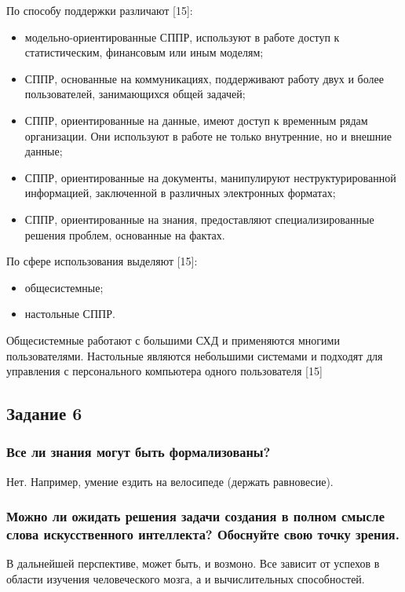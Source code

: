 \documentclass[14pt,a4paper,report]{report}
\begin{document}
По способу поддержки различают [15]:

\begin{itemize}
	\item модельно-ориентированные СППР, используют в работе доступ к статистическим, финансовым или иным моделям;
	\item СППР, основанные на коммуникациях, поддерживают работу двух и более пользователей, занимающихся общей задачей;
	\item СППР, ориентированные на данные, имеют доступ к временным рядам организации. Они используют в работе не только внутренние, но и внешние данные;
	\item СППР, ориентированные на документы, манипулируют неструктурированной информацией, заключенной в различных электронных форматах;
	\item СППР, ориентированные на знания, предоставляют специализированные решения проблем, основанные на фактах.
\end{itemize}	
	
По сфере использования выделяют [15]:

\begin{itemize}
	\item общесистемные;
	\item настольные СППР.
\end{itemize}

Общесистемные работают с большими СХД и применяются многими пользователями. Настольные являются небольшими системами и подходят для управления с персонального компьютера одного пользователя [15]

\subsection{Задание 6}

\subsubsection{Все ли знания могут быть формализованы?}

Нет. Например, умение ездить на велосипеде (держать равновесие).

\subsubsection{Можно ли ожидать решения задачи создания в полном смысле слова искусственного интеллекта? Обоснуйте свою точку зрения.}

В дальнейшей перспективе, может быть, и возмоно. Все зависит от успехов в области изучения человеческого мозга, а и вычислительных способностей.
\end{document}
